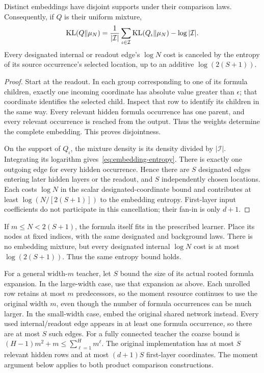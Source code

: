 \begin{lemma}\label{lem:embedding}
Distinct embeddings have disjoint supports under their comparison laws. Consequently, if $Q$ is their uniform mixture,
\begin{equation}
 \operatorname{KL}(Q\|\mu_N)
 =\frac1{|\mathcal I|}\sum_{\iota\in\mathcal I}
       \operatorname{KL}(Q_\iota\|\mu_N)-\log|\mathcal I|.
 \label{eq:embedding-entropy}
\end{equation}
Every designated internal or readout edge's $\log N$ cost is canceled by the entropy of its source occurrence's selected location, up to an additive $\log(2(S+1))$.
\end{lemma}
\begin{proof}
Start at the readout. In each group corresponding to one of its formula children, exactly one incoming coordinate has absolute value greater than $\epsilon$; that coordinate identifies the selected child. Inspect that row to identify its children in the same way. Every relevant hidden formula occurrence has one parent, and every relevant occurrence is reached from the output. Thus the weights determine the complete embedding. This proves disjointness.

On the support of $Q_\iota$, the mixture density is its density divided by $|\mathcal I|$. Integrating its logarithm gives~\eqref{eq:embedding-entropy}. There is exactly one outgoing edge for every hidden occurrence. Hence there are $S$ designated edges entering later hidden layers or the readout, and $S$ independently chosen locations. Each costs $\log N$ in the scalar designated-coordinate bound and contributes at least $\log(N/[2(S+1)])$ to the embedding entropy. First-layer input coefficients do not participate in this cancellation; their fan-in is only $d+1$.
\end{proof}

If $m\le N<2(S+1)$, the formula itself fits in the prescribed learner. Place its nodes at fixed indices, with the same designated and background laws. There is no embedding mixture, but every designated internal $\log N$ cost is at most $\log(2(S+1))$. Thus the same entropy bound holds.

For a general width-$m$ teacher, let $S$ bound the size of its actual rooted formula expansion. In the large-width case, use that expansion as above. Each unrolled row retains at most $m$ predecessors, so the moment resource continues to use the original width $m$, even though the number of formula occurrences can be much larger. In the small-width case, embed the original shared network instead. Every used internal/readout edge appears in at least one formula occurrence, so there are at most $S$ such edges. For a fully connected teacher the coarse bound is $(H-1)m^2+m\le\sum_{\ell=1}^H m^\ell$. The original implementation has at most $S$ relevant hidden rows and at most $(d+1)S$ first-layer coordinates. The moment argument below applies to both product comparison constructions.

